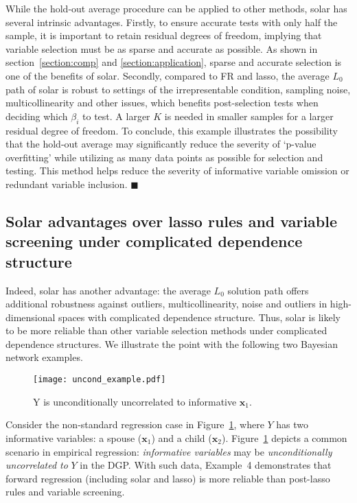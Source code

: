 \documentclass[12pt]{article}
\begin{document}
While the hold-out average procedure can be applied to other methods, solar has several intrinsic advantages. Firstly, to ensure accurate tests with only half the sample, it is important to retain residual degrees of freedom, implying that variable selection must be as sparse and accurate as possible. As shown in section~\ref{section:comp} and \ref{section:application}, sparse and accurate selection is one of the benefits of solar. Secondly, compared to FR and lasso, the average $L_0$ path of solar is robust to settings of the irrepresentable condition, sampling noise, multicollinearity and other issues, which benefits post-selection tests when deciding which $\beta_i$ to test. A larger $K$ is needed in smaller samples for a larger residual degree of freedom. To conclude, this example illustrates the possibility that the hold-out average may significantly reduce the severity of `p-value overfitting' while utilizing as many data points as possible for selection and testing. This method helps reduce the severity of informative variable omission or redundant variable inclusion. $\blacksquare$

\subsection{Solar advantages over lasso rules and variable screening under complicated dependence structure \label{section:example}}

Indeed, solar has another advantage: the average $L_0$ solution path offers additional robustness against outliers, multicollinearity, noise and outliers in high-dimensional spaces with complicated dependence structure. Thus, solar is likely to be more reliable than other variable selection methods under complicated dependence structures. We illustrate the point with the following two Bayesian network examples.

\begin{figure}[h]
%
  \centering
  \texttt{[image: uncond\_example.pdf]}
  \caption{Y is unconditionally uncorrelated to informative $\mathbf{x}_1$.}
  \label{fig:uncond_example}
%
\end{figure}

Consider the non-standard regression case in Figure~\ref{fig:uncond_example}, where $Y$ has two informative variables: a spouse ($\mathbf{x}_1$) and a child ($\mathbf{x}_2$). Figure~\ref{fig:uncond_example} depicts a common scenario in empirical regression: \emph{informative variables} may be \emph{unconditionally uncorrelated to} $Y$ in the DGP. With such data, Example~4 demonstrates that forward regression (including solar and lasso) is more reliable than post-lasso rules and variable screening.
\end{document}
